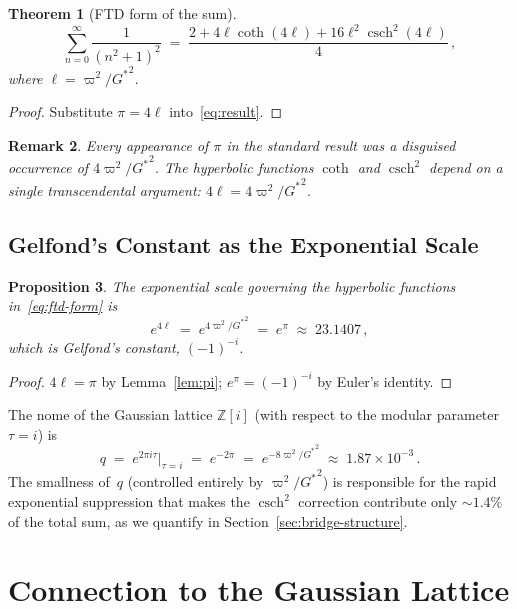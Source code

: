\documentclass[12pt]{article}
\newtheorem{theorem}{Theorem}[section]
\newtheorem{proposition}[theorem]{Proposition}
\newtheorem{remark}[theorem]{Remark}
\newcommand{\Z}{\mathbb{Z}}
\DeclareMathOperator{\csch}{csch}
\begin{document}
\begin{theorem}[FTD form of the sum]\label{thm:ftd}
\begin{equation}\label{eq:ftd-form}
\boxed{
\sum_{n=0}^{\infty}\frac{1}{(n^2+1)^2}
\;=\;\frac{2+4\ell\coth(4\ell)+16\ell^2\csch^2(4\ell)}{4}\,,
}
\end{equation}
where $\ell=\varpi^2/{G^{*}}^2$.
\end{theorem}
\begin{proof}
Substitute $\pi=4\ell$ into~\eqref{eq:result}.
\end{proof}

\begin{remark}\label{rem:pi-disguised}
Every appearance of $\pi$ in the standard result was a disguised occurrence
of $4\varpi^2/{G^{*}}^2$.  The hyperbolic functions $\coth$ and $\csch^2$
depend on a single transcendental argument: $4\ell=4\varpi^2/{G^{*}}^2$.
\end{remark}

\subsection{Gelfond's Constant as the Exponential Scale}

\begin{proposition}\label{prop:gelfond}
The exponential scale governing the hyperbolic functions
in~\eqref{eq:ftd-form} is
\[
e^{4\ell}\;=\;e^{4\varpi^2/{G^{*}}^2}\;=\;e^{\pi}\;\approx\;23.1407\,,
\]
which is Gelfond's constant, $(-1)^{-i}$.
\end{proposition}
\begin{proof}
$4\ell=\pi$ by Lemma~\ref{lem:pi}; $e^{\pi}=(-1)^{-i}$ by Euler's
identity.
\end{proof}

The nome of the Gaussian lattice $\Z[i]$ (with respect to the modular
parameter $\tau=i$) is
\[
q\;=\;e^{2\pi i\tau}\Big|_{\tau=i}\;=\;e^{-2\pi}\;=\;
e^{-8\varpi^2/{G^{*}}^2}\;\approx\;1.87\times 10^{-3}\,.
\]
The smallness of~$q$ (controlled entirely by $\varpi^2/{G^{*}}^2$) is
responsible for the rapid exponential suppression that makes the $\csch^2$
correction contribute only ${\sim}1.4\%$ of the total sum, as we quantify
in Section~\ref{sec:bridge-structure}.

\section{Connection to the Gaussian Lattice}\label{sec:gaussian}
\end{document}
